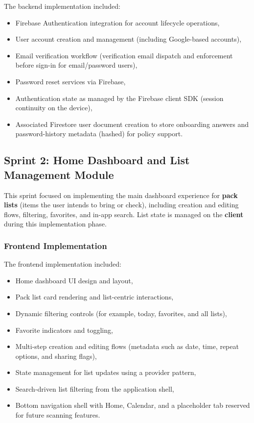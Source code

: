 The backend implementation included:

\begin{itemize}
    \item Firebase Authentication integration for account lifecycle operations,
    \item User account creation and management (including Google-based accounts),
    \item Email verification workflow (verification email dispatch and enforcement before sign-in for email/password users),
    \item Password reset services via Firebase,
    \item Authentication state as managed by the Firebase client SDK (session continuity on the device),
    \item Associated Firestore user document creation to store onboarding answers and password-history metadata (hashed) for policy support.
\end{itemize}

\subsection{Sprint 2: Home Dashboard and List Management Module}

This sprint focused on implementing the main dashboard experience for \textbf{pack lists}
(items the user intends to bring or check), including creation and editing flows,
filtering, favorites, and in-app search. List state is managed on the \textbf{client}
during this implementation phase.

\subsubsection{Frontend Implementation}

The frontend implementation included:

\begin{itemize}
    \item Home dashboard UI design and layout,
    \item Pack list card rendering and list-centric interactions,
    \item Dynamic filtering controls (for example, today, favorites, and all lists),
    \item Favorite indicators and toggling,
    \item Multi-step creation and editing flows (metadata such as date, time, repeat options, and sharing flags),
    \item State management for list updates using a provider pattern,
    \item Search-driven list filtering from the application shell,
    \item Bottom navigation shell with Home, Calendar, and a placeholder tab reserved for future scanning features.
\end{itemize}

